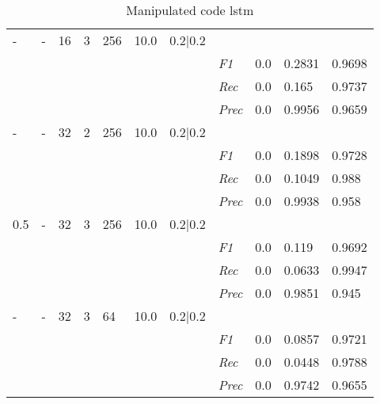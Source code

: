 \begin{table}[]
\begin{tabularx}{\textwidth}{XXXXXXX|X|X|X|X}
- & - & 16 & 3 & 256 &10.0 & 0.2|0.2 & & & & \\
& & & & & & & \textit{F1} & 0.0 & 0.2831 & 0.9698       \\
& & & & & & & \textit{Rec} &  0.0 & 0.165  & 0.9737  \\
& & & & & & & \textit{Prec} & 0.0 & 0.9956 & 0.9659 \\ \midrule
- & - & 32 & 2 & 256 &10.0 & 0.2|0.2 & & & & \\
& & & & & & & \textit{F1} & 0.0 & 0.1898 & 0.9728       \\
& & & & & & & \textit{Rec} &  0.0 & 0.1049  & 0.988  \\
& & & & & & & \textit{Prec} & 0.0 & 0.9938 & 0.958 \\ \midrule
0.5 & - & 32 & 3 & 256 &10.0 & 0.2|0.2 & & & & \\
& & & & & & & \textit{F1} & 0.0 & 0.119 & 0.9692       \\
& & & & & & & \textit{Rec} &  0.0 & 0.0633  & 0.9947  \\
& & & & & & & \textit{Prec} & 0.0 & 0.9851 & 0.945 \\ \midrule
- & - & 32 & 3 & 64 &10.0 & 0.2|0.2 & & & & \\
& & & & & & & \textit{F1} & 0.0 & 0.0857 & 0.9721       \\
& & & & & & & \textit{Rec} &  0.0 & 0.0448  & 0.9788  \\
& & & & & & & \textit{Prec} & 0.0 & 0.9742 & 0.9655 \\ \midrule
\end{tabularx}
\caption{Manipulated code lstm}
\label{tab:rq3_lstm}
\end{table}
